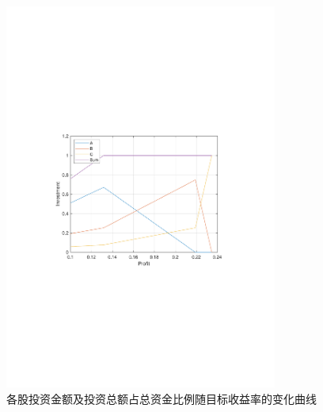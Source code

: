 \documentclass[12pt,a4paper]{article}
\begin{document}
\begin{figure}[H]
    \centering
    \includegraphics[width=0.8\textwidth,trim={3.09cm 9.295cm 3.09cm 9.295cm},clip]{fig/ex8_invest.pdf}
    \caption{各股投资金额及投资总额占总资金比例随目标收益率的变化曲线}
    \label{fig:ex8_invest}
\end{figure}
\end{document}
